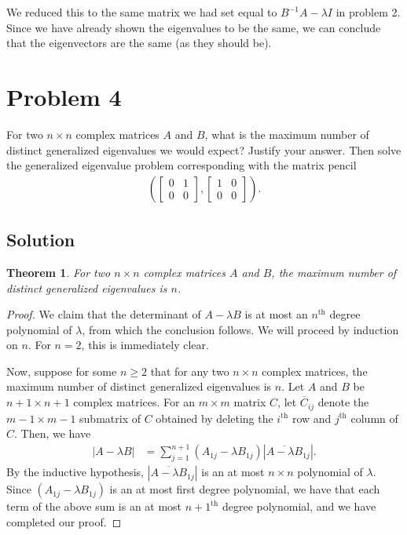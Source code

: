 \documentclass[10pt,a4paper]{article}
\newtheorem{theorem}{Theorem}
\theoremstyle{definition}
\begin{document}
We reduced this to the same matrix we had set equal to $B^{-1} A - \lambda I$ in problem 2. Since we have already shown the eigenvalues to be the same, we can conclude that the eigenvectors are the same (as they should be).

\section*{Problem 4}
For two $n \times n$ complex matrices $A$ and $B$, what is the maximum number of distinct generalized eigenvalues we would expect? Justify your answer. Then solve the generalized eigenvalue problem corresponding with the matrix pencil
\begin{align*}
\left( \begin{bmatrix}
0 & 1\\
0 & 0
\end{bmatrix}, \begin{bmatrix}
1 & 0\\
0 & 0
\end{bmatrix} \right).
\end{align*}

\subsection*{Solution}
\begin{theorem}
For two $n \times n$ complex matrices $A$ and $B$, the maximum number of distinct generalized eigenvalues is $n$.
\end{theorem}

\begin{proof}
We claim that the determinant of $A - \lambda B$ is at most an $n^\text{th}$ degree polynomial of $\lambda$, from which the conclusion follows. We will proceed by induction on $n$. For $n = 2$, this is immediately clear. 

Now, suppose for some $n \geq  2$ that for any two $n \times n$ complex matrices, the maximum number of distinct generalized eigenvalues is $n$. Let $A$ and $B$ be $n+1 \times n+1$ complex matrices. For an $m \times m$ matrix $C$, let $\overline{C}_{ij}$ denote the $m -1 \times m - 1$ submatrix of $C$ obtained by deleting the $i^\text{th}$ row and $j^\text{th}$ column of $C$. Then, we have
\begin{align*}
|A - \lambda B| &= \sum_{j = 1}^{n+1} (A_{1j} - \lambda B_{1j}) |\overline{A - \lambda B}_{1j}|.
\end{align*}
By the inductive hypothesis, $|\overline{A - \lambda B}_{1j}|$ is an at most $n \times n$ polynomial of $\lambda$. Since $(A_{1j} - \lambda B_{1j})$ is an at most first degree polynomial, we have that each term of the above sum is an at most $n+1^\text{th}$ degree polynomial, and we have completed our proof.
\end{proof}
\end{document}
